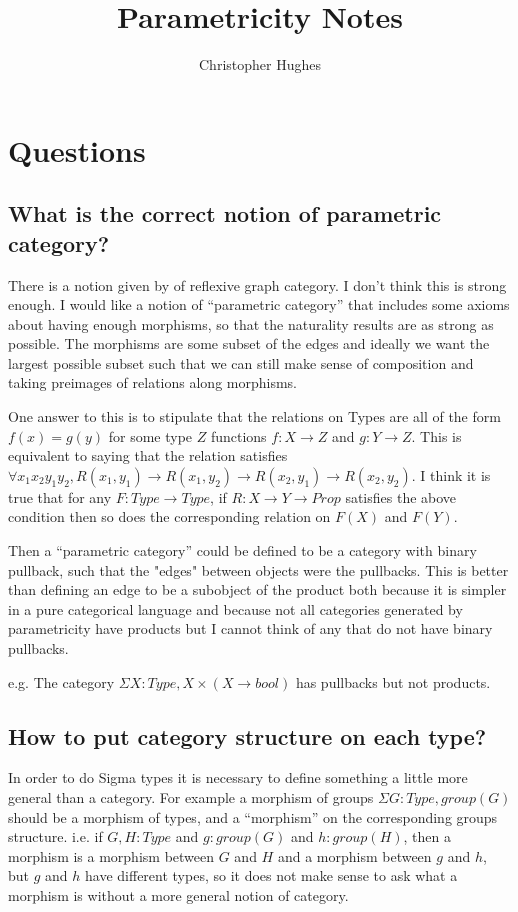 \documentclass[12pt]{article} %
\title{Parametricity Notes}
\author{Christopher Hughes}
\theoremstyle{definition}
\theoremstyle{definition}
\theoremstyle{definition}
\theoremstyle{definition}
\begin{document}
\section{Questions}

\subsection{What is the correct notion of parametric category?}

There is a notion given by \cite{Hermida2014LogicalRA} of reflexive graph category. 
I don't think this is strong enough. I would like a notion of ``parametric category'' that
includes some axioms about having enough morphisms, so that the naturality results are as strong as
possible. The morphisms are some subset of the edges and ideally we want the largest 
possible subset such that we can still make sense of composition and taking preimages of relations
along morphisms.

One answer to this is to stipulate that the relations on Types are all of the form $f(x) = g(y)$ for 
some type $Z$ functions $f : X \rightarrow Z$ and $g : Y \rightarrow Z$. This is equivalent to saying
that the relation satisfies $\forall x_1 x_2 y_1 y_2, R(x_1, y_1) \rightarrow R(x_1, y_2) 
\rightarrow R(x_2, y_1) \rightarrow R(x_2, y_2)$.
I think it is true that for any $F : Type \rightarrow Type$, if $R : X \rightarrow Y \rightarrow Prop$
satisfies the above condition then so does the corresponding relation on $F(X)$ and $F(Y)$.

Then a ``parametric category'' could be defined to be a category with binary pullback, such that 
the "edges" between objects were the pullbacks. This is better than defining an edge to be a subobject 
of the product both because it is simpler in a pure categorical language and because not all categories
generated by parametricity have products but I cannot think of any that do not have binary pullbacks.

e.g. The category $\Sigma X : Type, X \times (X \to bool)$ has pullbacks but not products. 


\subsection{How to put category structure on each type?}



In order to do Sigma types it is necessary to define something a little more general than a category.
For example a morphism of groups $\Sigma G : Type, group(G)$ should be a morphism of types, and a ``morphism''
on the corresponding groups structure. i.e. if $G, H : Type$ and $g : group(G)$ and $h : group(H)$,
then a morphism is a morphism between $G$ and $H$ and a morphism between $g$ and $h$, but $g$ and $h$ have 
different types, so it does not make sense to ask what a morphism is without a more general notion of category.
\end{document}
